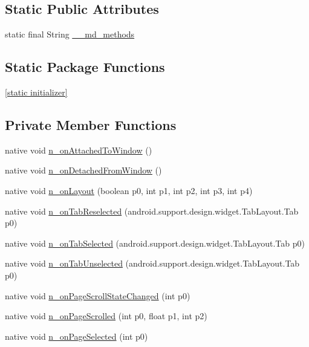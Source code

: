 \subsection*{Static Public Attributes}
\begin{CompactItemize}
\item 
static final String \hyperlink{classmd5270abb39e60627f0f200893b490a1ade_1_1_tabbed_page_renderer_61bf05aab3c9447ee5d368ab4be86a41}{\_\-\_\-md\_\-methods}
\end{CompactItemize}
\subsection*{Static Package Functions}
\begin{CompactItemize}
\item 
\hyperlink{classmd5270abb39e60627f0f200893b490a1ade_1_1_tabbed_page_renderer_725007151ad8e6a03c7aaa119956f76e}{\mbox{[}static initializer\mbox{]}}
\end{CompactItemize}
\subsection*{Private Member Functions}
\begin{CompactItemize}
\item 
native void \hyperlink{classmd5270abb39e60627f0f200893b490a1ade_1_1_tabbed_page_renderer_d0abc58418ee19fc0eb3c0f02189675c}{n\_\-onAttachedToWindow} ()
\item 
native void \hyperlink{classmd5270abb39e60627f0f200893b490a1ade_1_1_tabbed_page_renderer_06ad1a28c8566b4a6e4338aab262bc31}{n\_\-onDetachedFromWindow} ()
\item 
native void \hyperlink{classmd5270abb39e60627f0f200893b490a1ade_1_1_tabbed_page_renderer_4fb0dec5bc638178fcee3690897ce067}{n\_\-onLayout} (boolean p0, int p1, int p2, int p3, int p4)
\item 
native void \hyperlink{classmd5270abb39e60627f0f200893b490a1ade_1_1_tabbed_page_renderer_01ec360f376442d355008cdf6cb168b4}{n\_\-onTabReselected} (android.support.design.widget.TabLayout.Tab p0)
\item 
native void \hyperlink{classmd5270abb39e60627f0f200893b490a1ade_1_1_tabbed_page_renderer_1bd14ca1c0228a1aa5548d9f76c1a490}{n\_\-onTabSelected} (android.support.design.widget.TabLayout.Tab p0)
\item 
native void \hyperlink{classmd5270abb39e60627f0f200893b490a1ade_1_1_tabbed_page_renderer_0253eb405a19b6bcb6a1b48b68afbd83}{n\_\-onTabUnselected} (android.support.design.widget.TabLayout.Tab p0)
\item 
native void \hyperlink{classmd5270abb39e60627f0f200893b490a1ade_1_1_tabbed_page_renderer_a4d8436848d7db0020636b0af3052198}{n\_\-onPageScrollStateChanged} (int p0)
\item 
native void \hyperlink{classmd5270abb39e60627f0f200893b490a1ade_1_1_tabbed_page_renderer_161ccbbec617373684ccbe9b5c3cfa50}{n\_\-onPageScrolled} (int p0, float p1, int p2)
\item 
native void \hyperlink{classmd5270abb39e60627f0f200893b490a1ade_1_1_tabbed_page_renderer_02722c0ec664951d4510f9693e12ce38}{n\_\-onPageSelected} (int p0)
\end{CompactItemize}
